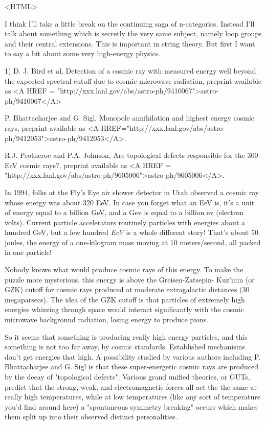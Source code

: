 <HTML>




I think I'll take a little break on the continuing saga of n-categories.
Instead I'll talk about something which is secretly the very same
subject, namely loop groups and their central extensions.  This is
important in string theory.  But first I want to say a bit about some
very high-energy physics.


1) D. J. Bird et al, Detection of a cosmic ray with measured energy
well beyond the expected spectral cutoff due to cosmic microwave
radiation, preprint available as <A HREF =
"http://xxx.lanl.gov/abs/astro-ph/9410067">astro-ph/9410067</A>

P. Bhattacharjee and G. Sigl, Monopole annihilation and highest energy
cosmic rays, preprint available as <A
HREF="http://xxx.lanl.gov/abs/astro-ph/9412053">astro-ph/9412053</A>.

R.J. Protheroe and P.A. Johnson, Are topological defects responsible
for the 300 EeV cosmic rays?, preprint
available as <A HREF =
"http://xxx.lanl.gov/abs/astro-ph/9605006">astro-ph/9605006</A>.


In 1994, folks at the Fly's Eye air shower detector in Utah observed a
cosmic ray whose energy was about 320 EeV.  In case you forget what an
EeV is, it's a unit of energy equal to a billion GeV, and a Gev is equal
to a billion ev (electron volts).  Current particle accelerators
routinely particles with energies about a hundred GeV, but a few hundred
\emph{EeV} is a whole different story!  That's about 50 joules, the energy of
a one-kilogram mass moving at 10 meters/second, all packed in one
particle!  

Nobody knows what would produce cosmic rays of this energy.  To make the
puzzle more mysterious, this energy is above the Greisen-Zatsepin-
Kuz'min (or GZK) cutoff for cosmic rays produced at moderate extragalactic
distances (30 megaparsecs).  The idea of the GZK cutoff is that
particles of extremely high energies whizzing through space would
interact significantly with the cosmic microwave background radiation,
losing energy to produce pions.  

So it seems that something is producing really high energy particles,
and this something is not too far away, by cosmic standards.
Established mechanisms don't get energies that high.  A possibility
studied by various authors including P. Bhattacharjee and G.  Sigl is
that these super-energetic cosmic rays are produced by the decay of
"topological defects".  Various grand unified theories, or GUTs, predict
that the strong, weak, and electromagnetic forces all act the the same
at really high temperatures, while at low temperatures (like any sort of
temperature you'd find around here) a "spontaneous symmetry breaking"
occurs which makes them split up into their observed distinct
personalities.  

